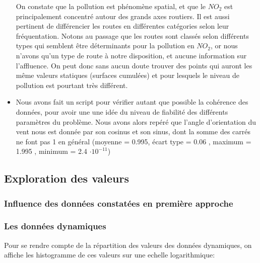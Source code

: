 \begin{itemize}
    On constate que la pollution est phénomène spatial, et que le $NO_2$ est principalement concentré autour des grands axes routiers. Il est aussi pertinent de différencier les routes en différentes catégories selon leur fréquentation. Notons au passage que les routes sont classés selon différents types qui semblent être déterminants pour la pollution en $NO_2$, or nous n'avons qu'un type de route à notre disposition, et aucune information sur l'affluence. On peut donc sans aucun doute trouver des points qui auront les même valeurs statiques (surfaces cumulées) et pour lesquels le niveau de pollution est pourtant très différent.    
  \item
    Nous avons fait un script pour vérifier autant que possible la cohérence des données, pour avoir une une idée du niveau de fiabilité des différents paramètres du problème. Nous avons alors repéré que l'angle d'orientation du vent nous est donnée par son cosinus et son sinus, dont la somme des carrés ne font pas 1 en général (moyenne = 0.995, écart type =  0.06 , maximum =  1.995 , minimum = 2.4 $\cdot 10^{-11}$)
 
    
\end{itemize}



\subsection{Exploration des valeurs}

\subsubsection{Influence des données constatées en première approche}

\subsubsection{Les données dynamiques}

Pour se rendre compte de la répartition des valeurs des données dynamiques, on affiche les histogramme de ces valeurs sur une echelle logarithmique:

